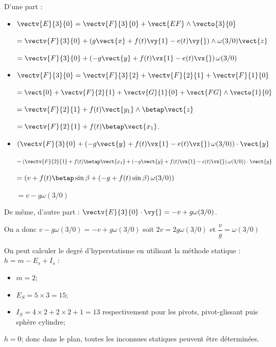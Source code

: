\ifprof
\begin{corrige}
D'une part :
\begin{itemize}
\item $\vectv{E}{3}{0} = \vectv{F}{3}{0} + \vect{EF}\wedge \vecto{3}{0}$

$= \vectv{F}{3}{0} + \left( g\vect{x} + f(t) \vy{1} - e(t) \vy{} \right)\wedge \omega(3/0) \vect{z}$ 

$= \vectv{F}{3}{0} + \left( -g\vect{y} + f(t) \vx{1} - e(t) \vx{} \right)\omega(3/0)$ 
\item $\vectv{F}{3}{0} = \vectv{F}{3}{2} + \vectv{F}{2}{1}+ \vectv{F}{1}{0}$ 

$= \vect{0} + \vectv{F}{2}{1}+ \vectv{G}{1}{0} + \vect{FG}\wedge \vecto{1}{0}$ 

$=  \vectv{F}{2}{1}+ f(t)\vect{y_1}\wedge \betap \vect{z}$  

$=  \vectv{F}{2}{1}+ f(t)  \betap  \vect{x_1}$.  

\item $\left(\vectv{F}{3}{0} + \left( -g\vect{y} + f(t) \vx{1} - e(t) \vx{} \right)\omega(3/0)\right)\cdot \vect{y}$

$=\left(\vectv{F}{2}{1}+ f(t)  \betap  \vect{x_1} + \left( -g\vect{y} + f(t) \vx{1} - e(t) \vx{} \right)\omega(3/0)\right)\cdot \vect{y}$

$=\left(v+ f(t)  \betap  \sin\beta  + \left( -g + f(t) \sin\beta  \right)\omega(3/0)\right)$


$=v -g \omega(3/0)$


\end{itemize}

De même, d'autre part : $\vectv{E}{3}{0} \cdot \vy{} = -v +g \omega(3/0)$.

On a donc $v -g \omega(3/0) = -v +g \omega(3/0)$ soit $2v =  2g \omega(3/0)$ et $\dfrac{v}{g} =  \omega(3/0)$
\end{corrige}
\else
\fi


\ifprof
\begin{corrige}
On peut calculer le degré d'hyperstatisme en utilisant la méthode statique : $h =m-E_s+I_s $ :
\begin{itemize}
\item $m=2$;
\item $E_S = 5 \times 3 = 15$; 
\item $I_S = 4\times2 + 2\times 2 + 1= 13$ respectivement pour les pivots, pivot-glissant puis sphère cylindre;
\end{itemize}
$h=0$; donc dans le plan, toutes les inconnues statiques peuvent être déterminées. 
\end{corrige}
\else
\fi


